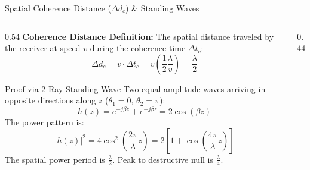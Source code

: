 \documentclass[aspectratio=169, 10pt]{beamer}
\begin{document}
\begin{frame}{Spatial Coherence Distance ($\Delta d_c$) \& Standing Waves}
\small
    \begin{columns}[T]
        \begin{column}{0.54\textwidth}
            \textbf{Coherence Distance Definition:}
            The spatial distance traveled by the receiver at speed $v$ during the coherence time $\Delta t_c$: 
           \vspace{-1em}
           \begin{equation}
                \boxed{\Delta d_c = v \cdot \Delta t_c = v \left(\frac{1}{2}\frac{\lambda}{v}\right) = \frac{\lambda}{2}}
            \end{equation}
\vspace{-1em}
            \begin{block}{Proof via 2-Ray Standing Wave}
            \small
                Two equal-amplitude waves arriving in opposite directions along $z$ ($\theta_1 = 0$, $\theta_2 = \pi$):
                \begin{equation}
                    h(z) = e^{-j\beta z} + e^{+j\beta z} = 2\cos(\beta z)
                \end{equation}
                The power pattern is:
                \begin{equation}
                    |h(z)|^2 = 4\cos^2\left(\frac{2\pi}{\lambda} z\right) = 2\left[1 + \cos\left(\frac{4\pi}{\lambda} z\right)\right]
                \end{equation}
                The spatial power period is $\frac{\lambda}{2}$. Peak to destructive null is $\frac{\lambda}{4}$.
            \end{block}
        \end{column}

        \begin{column}{0.44\textwidth}
            \begin{center}
\end{center}
\end{column}
\end{columns}
\end{frame}
\end{document}
